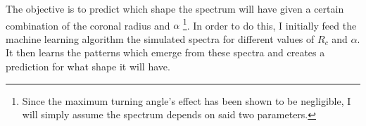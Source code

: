 The objective is to predict which shape the spectrum will have given a certain combination of the coronal radius and $\alpha$ \footnote{Since the maximum turning angle's effect has been shown to be negligible, I will simply assume the spectrum depends on said two parameters.}. In order to do this, I initially feed the machine learning algorithm the simulated spectra for different values of $R_c$ and $\alpha$. It then learns the patterns which emerge from these spectra and creates a prediction for what shape it will have.







